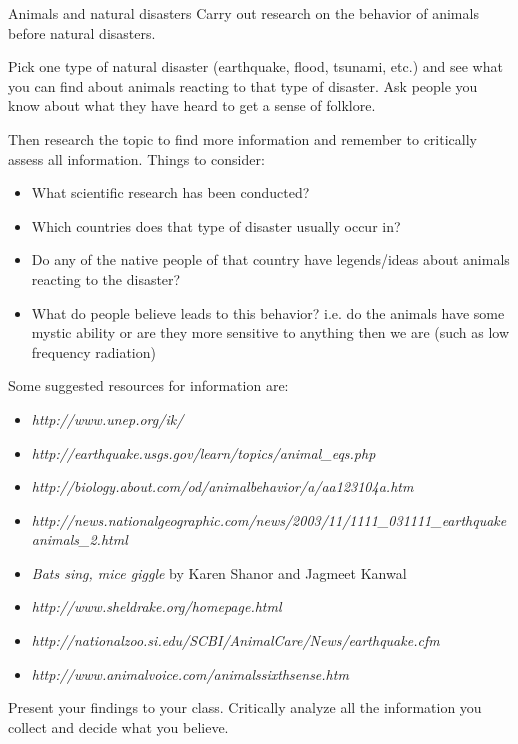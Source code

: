       \label{m38779*id1553831}
            \begin{project}{Animals and natural disasters}
            \nopagebreak
        \label{m38779*id1164119615164}Carry out research on the behavior of animals before natural disasters. \par 
        \label{m38779*id1164121934705}Pick one type of natural disaster (earthquake, flood, tsunami, etc.) and see what you can find about animals reacting to that type of disaster. Ask people you know about what they have heard to get a sense of folklore.\par 
        \label{m38779*id1164121037612}Then research the topic to find more information and remember to critically assess all information. Things to consider:\par 
        \label{m38779*id1164128014077}\begin{itemize}[noitemsep]
            \item What scientific research has been conducted?  
\item Which countries does that type of disaster usually occur in?
\item Do any of the native people of that country have legends/ideas about animals reacting to the disaster? 
\item What do people believe leads to this behavior? i.e. do the animals have some mystic ability or are they more sensitive to anything then we are (such as low frequency radiation)\end{itemize}
Some suggested resources for information are: 
\begin{itemize}[noitemsep]
\item \textsl{http://www.unep.org/ik/}
\item \textsl{http://earthquake.usgs.gov/learn/topics/animal\_eqs.php}
\item \textsl{http://biology.about.com/od/animalbehavior/a/aa123104a.htm} 
\item \textsl{http://news.nationalgeographic.com/news/2003/11/1111\_031111\_earthquakeanimals\_2.html}
\item \textsl{Bats sing, mice giggle} by Karen Shanor and Jagmeet Kanwal
\item \textsl{http://www.sheldrake.org/homepage.html}
\item \textsl{http://nationalzoo.si.edu/SCBI/AnimalCare/News/earthquake.cfm}
\item \textsl{http://www.animalvoice.com/animalssixthsense.htm}
\end{itemize}
        \label{m38779*id1164121076422}Present your findings to your class. Critically analyze all the information you collect and decide what you believe. \par 
      \label{m38779*cid9}
      \end{project}

